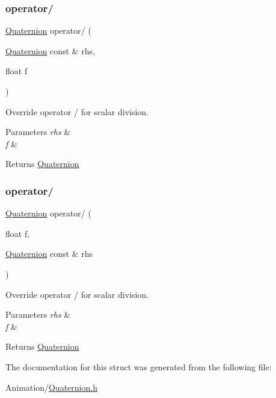 \subsubsection{\texorpdfstring{operator/}{operator/}\hspace{0.1cm}{\footnotesize\ttfamily [1/2]}}
{\footnotesize\ttfamily \hyperlink{structMathUtil_1_1Quaternion}{Quaternion} operator/ (\begin{DoxyParamCaption}\item[{\hyperlink{structMathUtil_1_1Quaternion}{Quaternion} const \&}]{rhs,  }\item[{float}]{f }\end{DoxyParamCaption})\hspace{0.3cm}{\ttfamily [friend]}}



Override operator / for scalar division. 


\begin{DoxyParams}{Parameters}
{\em rhs} & \\
\hline
{\em f} & \\
\hline
\end{DoxyParams}
\begin{DoxyReturn}{Returns}
\hyperlink{structMathUtil_1_1Quaternion}{Quaternion} 
\end{DoxyReturn}
\mbox{\label{structMathUtil_1_1Quaternion_a241417eeb3a5c9d24697776ff3ba3dfc}} 
\subsubsection{\texorpdfstring{operator/}{operator/}\hspace{0.1cm}{\footnotesize\ttfamily [2/2]}}
{\footnotesize\ttfamily \hyperlink{structMathUtil_1_1Quaternion}{Quaternion} operator/ (\begin{DoxyParamCaption}\item[{float}]{f,  }\item[{\hyperlink{structMathUtil_1_1Quaternion}{Quaternion} const \&}]{rhs }\end{DoxyParamCaption})\hspace{0.3cm}{\ttfamily [friend]}}



Override operator / for scalar division. 


\begin{DoxyParams}{Parameters}
{\em rhs} & \\
\hline
{\em f} & \\
\hline
\end{DoxyParams}
\begin{DoxyReturn}{Returns}
\hyperlink{structMathUtil_1_1Quaternion}{Quaternion} 
\end{DoxyReturn}


The documentation for this struct was generated from the following file\+:\begin{DoxyCompactItemize}
\item 
Animation/\hyperlink{Quaternion_8h}{Quaternion.\+h}\end{DoxyCompactItemize}
